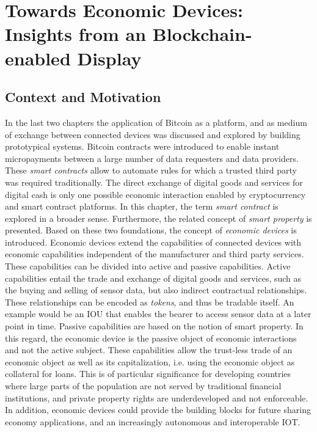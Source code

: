 \chapter{Towards Economic Devices: Insights from an Blockchain-enabled Display}
\label{sec:economicobjects}



\section{Context and Motivation}

In the last two chapters the application of Bitcoin as a platform, and as medium of exchange between connected devices was discussed and explored by building prototypical systems. Bitcoin contracts were introduced to enable instant micropayments between a large number of data requesters and data providers. These \emph{smart contracts} allow to automate rules for which a trusted third party was required traditionally. The direct exchange of digital goods and services for digital cash is only one possible economic interaction enabled by cryptocurrency and smart contract platforms. In this chapter, the term \emph{smart contract} is explored in a broader sense. Furthermore, the related concept of \emph{smart property} is presented. Based on these two foundations, the concept of \emph{economic devices} is introduced. Economic devices extend the capabilities of connected devices with economic capabilities independent of the manufacturer and third party services. These capabilities can be divided into active and passive capabilities. Active capabilities entail the trade and exchange of digital goods and services, such as the buying and selling of sensor data, but also indirect contractual relationships. These relationships can be encoded as \emph{tokens}, and thus be tradable itself. An example would be an IOU that enables the bearer to access sensor data at a later point in time. Passive capabilities are based on the notion of smart property. In this regard, the economic device is the passive object of economic interactions and not the active subject. These capabilities allow the trust-less trade of an economic object as well as its capitalization, i.e. using the economic object as collateral for loans. This is of particular significance for developing countries where large parts of the population are not served by traditional financial institutions, and private property rights are underdeveloped and not enforceable. In addition, economic devices could provide the building blocks for future sharing economy applications, and an increasingly autonomous and interoperable \ac{IOT}.

